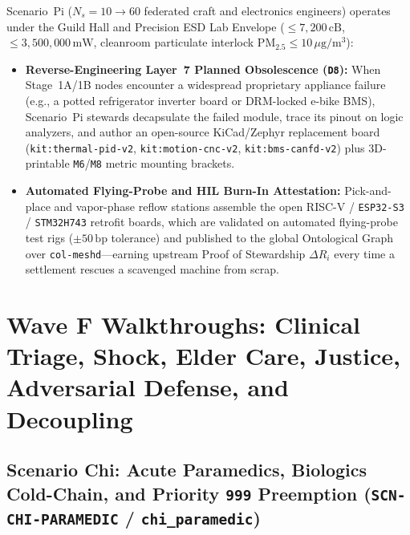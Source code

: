 Scenario~Pi ($N_s = 10 \to 60$ federated craft and electronics engineers) operates under the Guild Hall and Precision ESD Lab Envelope ($\le 7{,}200\,\mathrm{cB}$, $\le 3{,}500{,}000\,\mathrm{mW}$, cleanroom particulate interlock $\mathrm{PM}_{2.5} \le 10\,\mu\mathrm{g/m^3}$):
\begin{itemize}
    \item \textbf{Reverse-Engineering Layer~7 Planned Obsolescence (\texttt{D8}):} When Stage~1A/1B nodes encounter a widespread proprietary appliance failure (e.g., a potted refrigerator inverter board or DRM-locked e-bike BMS), Scenario~Pi stewards decapsulate the failed module, trace its pinout on logic analyzers, and author an open-source KiCad/Zephyr replacement board (\texttt{kit:thermal-pid-v2}, \texttt{kit:motion-cnc-v2}, \texttt{kit:bms-canfd-v2}) plus 3D-printable \texttt{M6}/\texttt{M8} metric mounting brackets.
    \item \textbf{Automated Flying-Probe and HIL Burn-In Attestation:} Pick-and-place and vapor-phase reflow stations assemble the open RISC-V / \texttt{ESP32-S3} / \texttt{STM32H743} retrofit boards, which are validated on automated flying-probe test rigs ($\pm 50\,\mathrm{bp}$ tolerance) and published to the global Ontological Graph over \texttt{col-meshd}---earning upstream Proof of Stewardship $\Delta R_i$ every time a settlement rescues a scavenged machine from scrap.
\end{itemize}

\section{Wave F Walkthroughs: Clinical Triage, Shock, Elder Care, Justice, Adversarial Defense, and Decoupling}
\label{sec:l2-wave-f-walkthroughs}

\subsection{Scenario Chi: Acute Paramedics, Biologics Cold-Chain, and Priority \texttt{999} Preemption (\texttt{SCN-CHI-PARAMEDIC} / \texttt{chi\_paramedic})}

